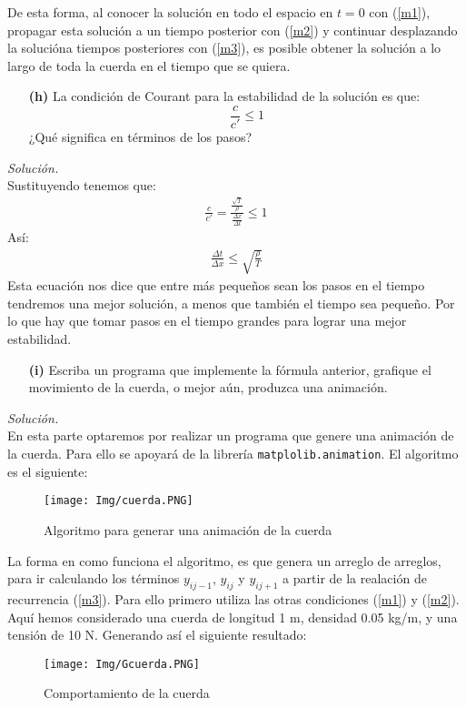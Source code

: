 \documentclass[11pt]{article}
\begin{document}
	De esta forma, al conocer la solución en todo el espacio en $t=0$ con (\ref{m1}), propagar esta solución a un tiempo posterior con (\ref{m2}) y continuar desplazando la solucióna tiempos posteriores con (\ref{m3}), es posible obtener la solución a lo largo de toda la cuerda en el tiempo que se quiera. 

\begin{enumerate}
	\item [\textbf{(h)}] La condición de Courant para la estabilidad de la solución es que:
	$$\frac{c}{c'}\leq 1$$
	¿Qué significa en términos de los pasos?
\end{enumerate}
\textit{Solución.}\\	
	Sustituyendo tenemos que:
	\begin{align*}
		\frac{c}{c'} = \frac{\frac{\sqrt{T}}{\rho}}{\frac{\Delta x}{\Delta t}}	\leq1
	\end{align*}
	Así:
	\begin{align}
		\frac{\Delta t}{\Delta x} \leq \sqrt{\frac{\rho}{T}}	\label{estabilidad2}
	\end{align}
	Esta ecuación nos dice que entre más pequeños sean los pasos en el tiempo tendremos una mejor solución, a menos que también el tiempo sea pequeño. Por lo que hay que tomar pasos en el tiempo grandes para lograr una mejor estabilidad.
	
\begin{enumerate}
	\item [\textbf{(i)}] Escriba un programa que implemente la fórmula anterior, grafique el movimiento de la cuerda, o mejor aún, produzca una animación. 
\end{enumerate}
\textit{Solución.}\\
	En esta parte optaremos por realizar un programa que genere una animación de la cuerda. Para ello se apoyará de la librería \texttt{matplolib.animation}. El algoritmo es el siguiente:
\newpage	
	\begin{figure}[h]
		\centering
		\texttt{[image: Img/cuerda.PNG]}
		\caption{Algoritmo para generar una animación de la cuerda}
	\end{figure}
	
	La forma en como funciona el algoritmo, es que genera un arreglo de arreglos, para ir calculando los términos $y_{ij-1}$, $y_{ij}$ y $y_{ij+1}$ a partir de la realación de recurrencia (\ref{m3}). Para ello primero utiliza las otras condiciones (\ref{m1}) y (\ref{m2}). Aquí hemos considerado una cuerda de longitud 1 m, densidad  0.05 kg/m, y una tensión de 10 N. Generando así el siguiente resultado:
\newpage
	\begin{figure}[h]
		\centering
		\texttt{[image: Img/Gcuerda.PNG]}
		\caption{Comportamiento de la cuerda}
	\end{figure}
	
\end{document}
